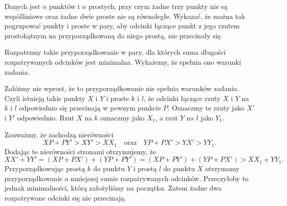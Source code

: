 \newpage
{}

\begin{problem}{1}
	Danych jest $n$ punktów i $n$ prostych, przy czym żadne trzy punkty nie są współliniowe oraz żadne dwie proste nie są równoległe. Wykazać, że można tak pogrupować punkty i proste w pary, aby odcinki łączące punkt z jego rzutem prostokątnym na przyporządkowaną do niego prostą, nie przecinały się.
\end{problem}

\noindent
Rozpatrzmy takie przyporządkowanie w pary, dla których suma długości rozpatrywanych odcinków jest minimalna. Wykażemy, że spełnia ono warunki zadania.

\vspace{10px}
\noindent
Załóżmy nie wprost, że to przyporządkowanie nie spełnia warunków zadania. Czyli istnieją takie punkty $X$ i $Y$ i proste $k$ i $l$, że odcinki łączące rzuty $X$ i $Y$ na $k$ i $l$ odpowiednio się przecinają w pewnym punkcie $P$. Oznaczmy te rzuty jako $X'$ i $Y'$ odpowiednio. Rzut $X$ na $k$ oznaczmy jako $X_1$, a rzut $Y$ na $l$ jako $Y_1$.

\begin{center}
\end{center}

\noindent
Zauważmy, że zachodzą nierówności
\[
	XP + PY' > XY' > XX_1 \quad \text{oraz} \quad YP + PX' > YX' > YY_1.
\]
Dodając te nierówności stronami otrzymujemy, że
\[
	XX' + YY' = (XP + PX') + (YP + PY') = (XP + PY') + (YP + PX') > XX_1 + YY_1.
\]
Przyporządkowując prostą $k$ do punktu $Y$ i prostą $l$ do punktu $X$ otrzymamy przyporządkowanie o mniejszej sumie rozpatrywanych odcinków. Przeczyłoby to jednak minimalności, którą założyliśmy na początku. Zatem żadne dwa rozpatrywane odcinki się nie przecinają.

